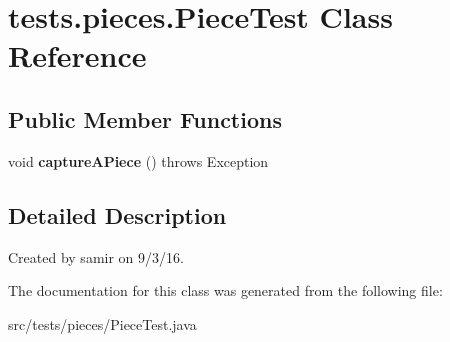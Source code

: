 \hypertarget{classtests_1_1pieces_1_1_piece_test}{}\section{tests.\+pieces.\+Piece\+Test Class Reference}
\label{classtests_1_1pieces_1_1_piece_test}
\subsection*{Public Member Functions}
\begin{DoxyCompactItemize}
\item 
\hypertarget{classtests_1_1pieces_1_1_piece_test_a51a3855c40d3da846cd11f8fc6881471}{}\label{classtests_1_1pieces_1_1_piece_test_a51a3855c40d3da846cd11f8fc6881471} 
void {\bfseries capture\+A\+Piece} ()  throws Exception 
\end{DoxyCompactItemize}


\subsection{Detailed Description}
Created by samir on 9/3/16. 

The documentation for this class was generated from the following file\+:\begin{DoxyCompactItemize}
\item 
src/tests/pieces/Piece\+Test.\+java\end{DoxyCompactItemize}
